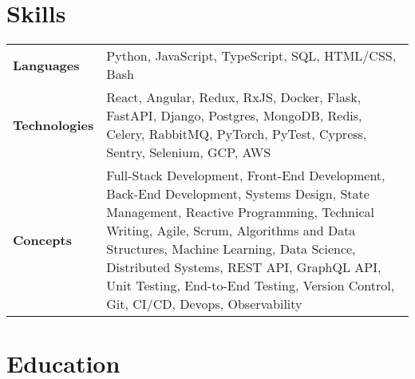 \documentclass{ethan_cv}
\begin{document}
\section{Skills}
    \small
     \begin{tabular}{p{2.25cm} p{16cm}}
         \textbf{Languages} & Python, JavaScript, TypeScript, SQL, HTML/CSS, Bash \\ 
         \textbf{Technologies} & React, Angular, Redux, RxJS, Docker, Flask, FastAPI, Django, Postgres, MongoDB, Redis, Celery, RabbitMQ, PyTorch, PyTest, Cypress, Sentry, Selenium, GCP, AWS \\
         \textbf{Concepts} & Full-Stack Development, Front-End Development, Back-End Development, Systems Design, State Management, Reactive Programming, Technical Writing, Agile, Scrum, Algorithms and Data Structures, Machine Learning, Data Science, Distributed Systems, REST API, GraphQL API, Unit Testing, End-to-End Testing, Version Control, Git, CI/CD, Devops, Observability
     \end{tabular}
     \vspace{+3mm}


\section{Education}
\end{document}
